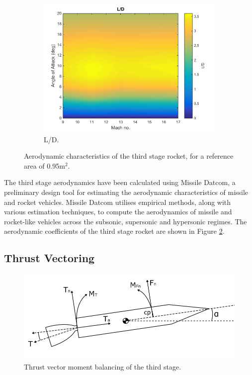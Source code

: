 \begin{figure}[ht]
\begin{subfigure}{.5\textwidth}
					\includegraphics[width=0.99\linewidth]{figures/3_vehicle_design/ThirdStageLD}
					\caption{L/D.}
					\label{fig:LD-ThirdStage}
				\end{subfigure}
				\caption{Aerodynamic characteristics of the third stage rocket, for a reference area of 0.95m$^2$.}
				\label{fig:ThirdStageAero}
			\end{figure}
		The third stage aerodynamics have been calculated using Missile Datcom\cite{Rosema2011}, a preliminary design tool for estimating the aerodynamic characteristics of missile and rocket vehicles. Missile Datcom utilises empirical methods, along with various estimation techniques, to compute the aerodynamics of missile and rocket-like vehicles across the subsonic, supersonic and hypersonic regimes. The aerodynamic coefficients of the third stage rocket are shown in Figure \ref{fig:ThirdStageAero}. 
		
		
	
		
		
		
		\subsection{Thrust Vectoring}\label{sec:thrustvectoring}
		\begin{figure}[ht]
			\centering
			\includegraphics[width=0.7\linewidth]{figures/3_vehicle_design/ThrustVec}
			\caption{Thrust vector moment balancing of the third stage.}
			\label{fig:ThrustVec}
		\end{figure}
		
